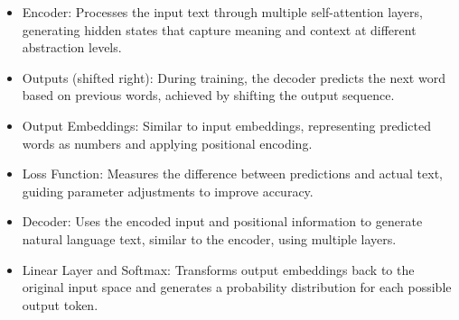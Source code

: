 \documentclass{ws-ijait}
\begin{document}
\begin{itemize}
\begin{itemize}
		
		
		\item Encoder: Processes the input text through multiple self-attention layers, generating hidden states that capture meaning and context at different abstraction levels.
		
		\item Outputs (shifted right): During training, the decoder predicts the next word based on previous words, achieved by shifting the output sequence.
		\item Output Embeddings: Similar to input embeddings, representing predicted words as numbers and applying positional encoding.
		\item Loss Function: Measures the difference between predictions and actual text, guiding parameter adjustments to improve accuracy.
		\item Decoder: Uses the encoded input and positional information to generate natural language text, similar to the encoder, using multiple layers.
		\item Linear Layer and Softmax: Transforms output embeddings back to the original input space and generates a probability distribution for each possible output token.
	\end{itemize}
\end{itemize}
\end{document}
